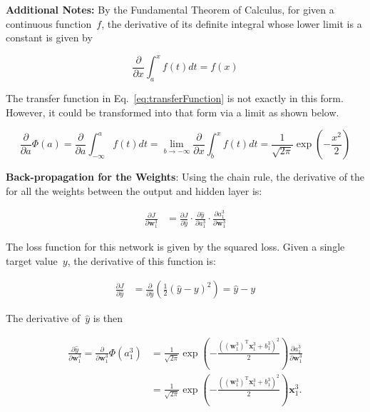 \documentclass{report}
\newcommand{\w}{\mathbf{w}}
\newcommand{\xvec}{\mathbf{x}}
\newcommand{\yhat}{\hat{y}}
\newcommand{\T}{\text{T}}
\begin{document}
  \textbf{Additional Notes:} By the Fundamental Theorem of Calculus, for given a continuous function~$f$, the derivative of its definite integral whose lower limit is a constant is given by
  
  \begin{equation}
    \frac{\partial}{\partial x}\int_{a}^{x}f(t)dt=f(x)
  \end{equation}
  
  The transfer function in Eq.~\ref{eq:transferFunction} is not exactly in this form.  However, it could be transformed into that form via a limit as shown below.
  
  \begin{equation}
    \frac{\partial}{\partial a} \Phi(a) = \frac{\partial}{\partial a} \int_{-\infty}^{a}f(t)dt =\underset{b\rightarrow -\infty}\lim \frac{\partial}{\partial x} \int_{b}^{x}f(t)dt=\frac{1}{\sqrt{2\pi}} \exp\left( -\frac{x^{2}}{2} \right)
  \end{equation}
  
  \textbf{Back-propagation for the Weights}: Using the chain rule, the derivative of the  for all the weights between the output and hidden layer is:
  
  \begin{align}
    \frac{\partial J}{\partial \w_{1}^{3}} &= \frac{\partial J}{\partial \yhat} \cdot \frac{\partial \yhat}{\partial a_{1}^{3}} \cdot \frac{\partial a_{1}^{3}}{\partial \w_{1}^{3}} 
  \end{align}
  
  The loss function for this network is given by the squared loss.  Given a single target value~$y$, the derivative of this function is:
  
  \begin{align}
    \frac{\partial J}{\partial \yhat} &= \frac{\partial}{\partial \yhat} \left(\frac{1}{2} \left( \yhat - y\right)^2 \right) = \yhat - y \label{eq:derivLoss}
  \end{align}
  
  The derivative of~$\yhat$ is then
  
  \begin{align}
    \frac{\partial \yhat}{\partial \w_{1}^{3}} = \frac{\partial}{\partial \w_{1}^{3}}\Phi(a_{1}^{3}) &=\frac{1}{\sqrt{2\pi}} \exp\left( -\frac{\left(\left(\w_{1}^{3}\right)^\T\xvec_{1}^{3}+b_{1}^{3}\right)^{2}}{2} \right)\frac{\partial a_{1}^{3}}{\partial \w_{1}^{3}} \\
    &=\frac{1}{\sqrt{2\pi}} \exp\left( -\frac{\left(\left(\w_{1}^{3}\right)^\T\xvec_{1}^{3}+b_{1}^{3}\right)^{2}}{2} \right)\xvec_{1}^{3}\textrm{.}
  \end{align}
  
\end{document}
